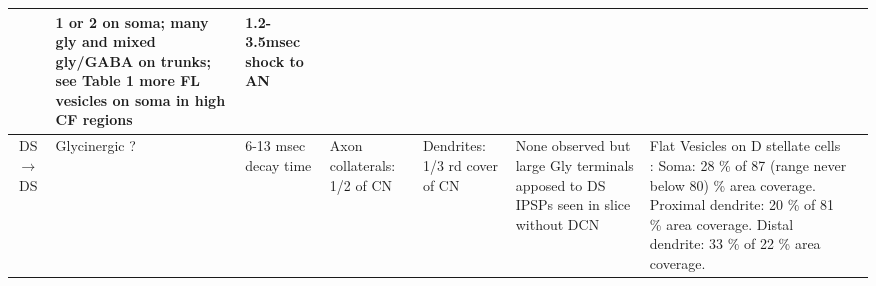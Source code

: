 \begin{longtable}{cYYYYYYY}
& %
1 or 2 on soma; many gly and mixed gly/GABA on trunks; see Table 1\citep{SmithRhode:1989} more FL
    vesicles on soma in high CF regions \citep{JosephsonMorest:1998}      
& 
1.2-3.5msec shock to AN \citep{FerragamoGoldingEtAl:1998a,NeedhamPaolini:2003} \citep{Oertel:1983}
\\ \midrule
DS\ensuremath{\rightarrow}DS                        
& %
Glycinergic                   \citep{FerragamoGoldingEtAl:1998a}?                    
& %
6-13 msec decay time \citep{AwatramaniTurecekEtAl:2005,HartyManis:1996,HartyManis:1998,LeaoOleskevichEtAl:2004}
& %
Axon collaterals: 1/2 of CN
& %
Dendrites: 1/3 rd cover of CN
& %
None observed but large Gly terminals apposed to DS \citep[cat][]{SmithRhode:1989} 
IPSPs seen in slice without DCN \citep{FerragamoGoldingEtAl:1998a}                     
&    
Flat Vesicles on D stellate cells \citep[cat][]{SmithRhode:1989}:
Soma: 28 \%  of 87 (range never below 80) \% area coverage. 
Proximal dendrite: 20 \%  of 81 \% area coverage.  
Distal dendrite: 33 \%  of 22 \% area coverage.   


\end{longtable}
